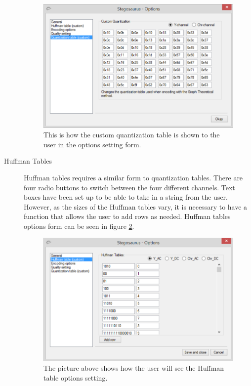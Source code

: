 \begin{description}
\begin{figure}
	\centering
	\includegraphics[width=1\textwidth]{figures/StegoOptionQuant.png}
	\caption{This is how the custom quantization table is shown to the user in the options setting form.}
	\label{fig:StegoOptionQuant}
\end{figure}

\item[Huffman Tables]

Huffman tables requires a similar form to quantization tables. There are four radio buttons to switch between the four different channels. Text boxes have been set up to be able to take in a string from the user. However, as the sizes of the Huffman tables vary, it is necessary to have a function that allows the user to add rows as needed. Huffman tables options form can be seen in figure \ref{fig:StegoOptionHuff2}.


\begin{figure}
	\centering
	\includegraphics[width=1\textwidth]{figures/StegoOptionHuff2.png}
	\caption{The picture above shows how the user will see the Huffman table options setting.}
	\label{fig:StegoOptionHuff2}
\end{figure}


\end{description}
